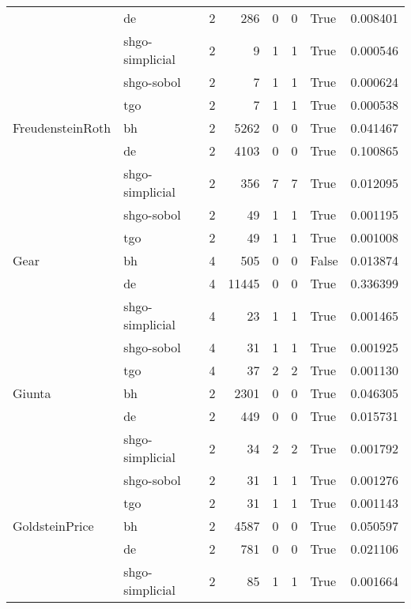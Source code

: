 \begin{longtable}{llrrrrlr}
         & de &     2 &      286 &      0 &       0 &    True &    0.008401 \\
         & shgo-simplicial &     2 &        9 &      1 &       1 &    True &    0.000546 \\
         & shgo-sobol &     2 &        7 &      1 &       1 &    True &    0.000624 \\
         & tgo &     2 &        7 &      1 &       1 &    True &    0.000538 \\
FreudensteinRoth & bh &     2 &     5262 &      0 &       0 &    True &    0.041467 \\
         & de &     2 &     4103 &      0 &       0 &    True &    0.100865 \\
         & shgo-simplicial &     2 &      356 &      7 &       7 &    True &    0.012095 \\
         & shgo-sobol &     2 &       49 &      1 &       1 &    True &    0.001195 \\
         & tgo &     2 &       49 &      1 &       1 &    True &    0.001008 \\
Gear & bh &     4 &      505 &      0 &       0 &   False &    0.013874 \\
         & de &     4 &    11445 &      0 &       0 &    True &    0.336399 \\
         & shgo-simplicial &     4 &       23 &      1 &       1 &    True &    0.001465 \\
         & shgo-sobol &     4 &       31 &      1 &       1 &    True &    0.001925 \\
         & tgo &     4 &       37 &      2 &       2 &    True &    0.001130 \\
Giunta & bh &     2 &     2301 &      0 &       0 &    True &    0.046305 \\
         & de &     2 &      449 &      0 &       0 &    True &    0.015731 \\
         & shgo-simplicial &     2 &       34 &      2 &       2 &    True &    0.001792 \\
         & shgo-sobol &     2 &       31 &      1 &       1 &    True &    0.001276 \\
         & tgo &     2 &       31 &      1 &       1 &    True &    0.001143 \\
GoldsteinPrice & bh &     2 &     4587 &      0 &       0 &    True &    0.050597 \\
         & de &     2 &      781 &      0 &       0 &    True &    0.021106 \\
         & shgo-simplicial &     2 &       85 &      1 &       1 &    True &    0.001664 \\

\end{longtable}
